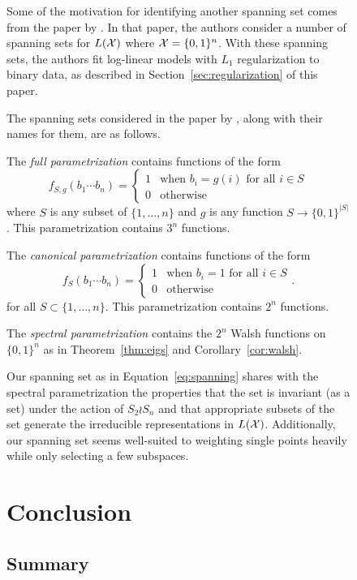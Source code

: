 \documentclass[cclicense]{hmcthesis}
\numberwithin{equation}{chapter}
\numberwithin{ucounter}{chapter}
\begin{document}
\begin{figure}
    Some of the motivation for identifying another spanning set comes from the
    paper by \citet{SPEC}.  In that paper, the authors consider a number of
    spanning sets for $L(\mathcal{X})$ where $\mathcal{X} = \{0, 1\}^n$.  With these spanning
    sets, the authors fit log-linear models with $L_1$ regularization to binary
    data, as described in Section~\ref{sec:regularization} of this paper.

    The spanning sets considered in the paper by \citet{SPEC}, along with their
    names for them, are as follows.

    The \emph{full parametrization} contains functions of the form
    \[
        f_{S, g}(b_1 \cdots b_n) = \begin{cases}
            1 & \text{when $b_i = g(i)$ for all $i \in S$} \\
            0 & \text{otherwise}
        \end{cases}
    \]
    where $S$ is any subset of $\{1, \ldots, n\}$ and $g$ is any function $S \to
    \{0, 1\}^{|S|}$.  This parametrization contains $3^n$ functions.

    The \emph{canonical parametrization} contains functions of the form
    \[
        f_S(b_1 \cdots b_n) = \begin{cases}
            1 & \text{when $b_i = 1$ for all $i \in S$} \\
            0 & \text{otherwise}
        \end{cases}.
    \]
    for all $S \subset \{1, \ldots, n\}$.  This parametrization contains $2^n$
    functions.

    The \emph{spectral parametrization} contains the $2^n$ Walsh functions on
    $\{0, 1\}^n$ as in Theorem~\ref{thm:eigs} and Corollary~\ref{cor:walsh}.

    Our spanning set as in Equation~\ref{eq:spanning} shares with the spectral
    parametrization the properties that the set is invariant (as a set) under
    the action of $S_2 \wr S_n$ and that appropriate subsets of the set generate
    the irreducible representations in $L(\mathcal{X})$.  Additionally, our spanning set
    seems well-suited to weighting single points heavily while only selecting a
    few subspaces.



\chapter{Conclusion}

\section{Summary}


\end{figure}
\end{document}
